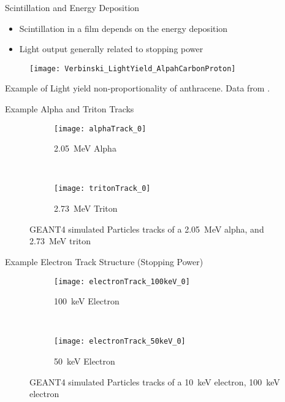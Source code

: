 \begin{frame}{Scintillation and Energy Deposition}
  \begin{itemize}
    \item Scintillation in a film depends on the energy deposition
    \item Light output generally related to stopping power
  \end{itemize}
  \begin{figure}
    \centering
    \texttt{[image: Verbinski\_LightYield\_AlpahCarbonProton]}
  \end{figure}
  Example of Light yield non-proportionality of anthracene. Data from \cite{Verbinski_1968}.
\hyperlink{EDepScint}{}
\hyperlink{toc}{}
\end{frame}
\begin{frame}{Example Alpha and Triton Tracks}
  \begin{figure}
    \begin{subfigure}[b]{0.45\textwidth}
      \texttt{[image: alphaTrack\_0]}
      \caption{\SI{2.05}{\MeV} Alpha}
    \end{subfigure}%
    ~
    \begin{subfigure}[b]{0.45\textwidth}
      \texttt{[image: tritonTrack\_0]}
      \caption{\SI{2.73}{\MeV} Triton}
    \end{subfigure}
    \caption[Particle Tracks of Alpha, Triton]{GEANT4 simulated Particles tracks of a \SI{2.05}{\MeV} alpha, and \SI{2.73}{\MeV} triton}
  \end{figure}
\hyperlink{EDepScint}{}
\hyperlink{toc}{}
\end{frame}
\begin{frame}{Example Electron Track Structure (Stopping Power)}
  \begin{figure}
    \begin{subfigure}[b]{0.45\textwidth}
      \texttt{[image: electronTrack\_100keV\_0]}
      \caption{\SI{100}{\keV} Electron}
    \end{subfigure}
   ~ 
    \begin{subfigure}[b]{0.45\textwidth}
      \texttt{[image: electronTrack\_50keV\_0]}
      \caption{\SI{50}{\keV} Electron}
    \end{subfigure}%
    \caption{GEANT4 simulated Particles tracks of a \SI{10}{\keV} electron, \SI{100}{\keV} electron}
  \end{figure}
\hyperlink{EDepScint}{}
\hyperlink{toc}{}
\end{frame}
